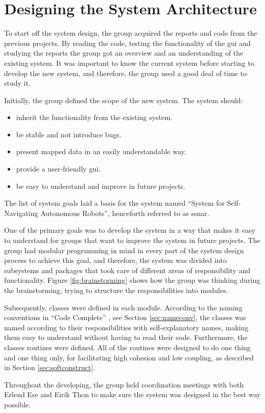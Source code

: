 \section{Designing the System Architecture}
To start off the system design, the group acquired the reports and code from the previous projects. By reading the code, testing the functionality of the \acrshort{gui} and studying the reports the group got an overview and an understanding of the existing system. It was important to know the current system before starting to develop the new system, and therefore, the group used a good deal of time to study it.

Initially, the group defined the scope of the new system. The system should:
\begin{itemize}
    \item inherit the functionality from the existing system.
    \item be stable and not introduce bugs.
    \item present mapped data in an easily understandable way.
    \item provide a user-friendly \acrshort{gui}.
    \item be easy to understand and improve in future projects.
\end{itemize}
The list of system goals laid a basis for the system named ``System for Self-Navigating Autonomous Robots'', henceforth referred to as \acrshort{ssnar}.

One of the primary goals was to develop the system in a way that makes it easy to understand for groups that want to improve the system in future projects. The group had modular programming in mind in every part of the system design process to achieve this goal, and therefore, the system was divided into subsystems and packages that took care of different areas of responsibility and functionality. Figure \ref{fig:brainstorming} shows how the group was thinking during the brainstorming, trying to structure the responsibilities into modules. 

Subsequently, classes were defined in each module. According to the naming conventions in ``Code Complete'' \cite{stevemcconnell2004}, see Section \ref{sec:nameconv}, the classes was named according to their responsibilities with self-explanatory names, making them easy to understand without having to read their code. Furthermore, the classes routines were defined. All of the routines were designed to do one thing and one thing only, for facilitating high cohesion and low coupling, as described in Section \ref{sec:softconstruct}.

Throughout the developing, the group held coordination meetings with both Erlend Ese and Eirik Thon to make sure the system was designed in the best way possible.
